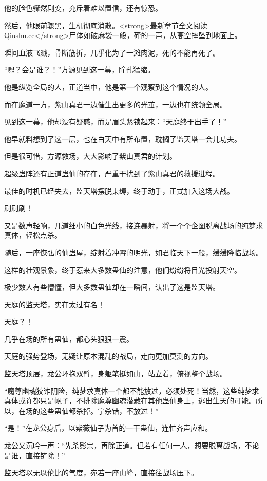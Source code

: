\begin{this_body}
他的脸色骤然剧变，充斥着难以置信，还有惊恐。

然后，他眼前骤黑，生机彻底消散。<strong>最新章节全文阅读Qiushu.cc</strong>尸体如破麻袋一般，砰的一声，从高空摔坠到地面上。

瞬间血液飞溅，骨断筋折，几乎化为了一滩肉泥，死的不能再死了。

“嗯？会是谁？！”方源见到这一幕，瞳孔猛缩。

他是纵览全局的人，正道当中，他是第一个观察到这个情况的人。

而在魔道一方，紫山真君一边催生出更多的光茧，一边也在统领全局。

见到这一幕，他却没有疑惑，而是眉头紧锁起来：“天庭终于出手了！”

他早就料想到了这一层，也在白天中有所布置，耽搁了监天塔一会儿功夫。

但是很可惜，方源救场，大大影响了紫山真君的计划。

超级蛊阵还有正道蛊仙的存在，严重干扰到了紫山真君的救援进程。

最佳的时机已经失去，监天塔摆脱束缚，终于动手，正式加入这场大战。

刷刷刷！

又是数声轻响，几道细小的白色光线，接连暴射，将一个个企图脱离战场的纯梦求真体，轻松点杀。

随后，一座恢弘的仙蛊屋，绽射着冲霄的明光，如君临天下一般，缓缓降临战场。

这样的壮观景象，终于惹来大多数蛊仙的注意，他们纷纷将目光投射天空。

极少数人有些懵懂，但大多数蛊仙却在一瞬间，认出了这是监天塔。

天庭的监天塔，实在太过有名！

天庭？！

几乎在场的所有蛊仙，都心头狠狠一震。

天庭的强势登场，无疑让原本混乱的战局，走向更加莫测的方向。

监天塔顶层，龙公环抱双臂，身躯笔挺如山，站立着，俯视整个战场。

“魔尊幽魂狡诈阴险，纯梦求真体一个都不能放过，必须处死！当然，这些纯梦求真体或许都只是幌子，不排除魔尊幽魂潜藏在其他蛊仙身上，逃出生天的可能。所以，在场的这些蛊仙都杀掉。宁杀错，不放过！”

“是！”在龙公身后，以紫薇仙子为首的一干蛊仙，连忙齐声应和。

龙公又沉吟一声：“先杀影宗，再除正道。但若有任何一人，想要脱离战场，不论是谁，直接铲除！”

监天塔以无以伦比的气度，宛若一座山峰，直接往战场压下。


\end{this_body}
